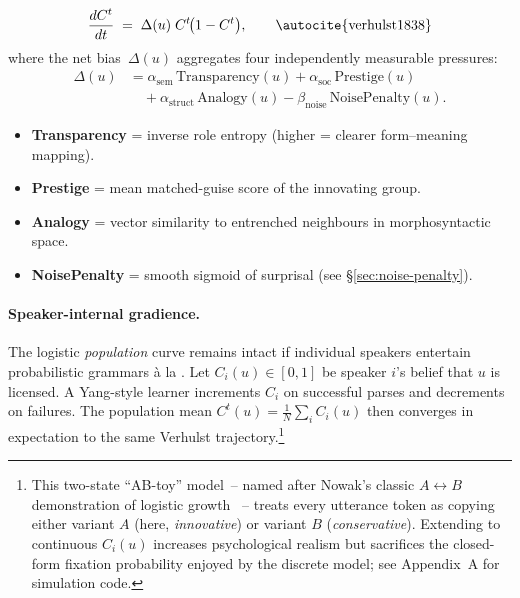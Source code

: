 \documentclass[12pt]{article}
\begin{document}
\begin{equation}
\frac{dC^{t}}{dt} \;=\; \Delta(u)\;C^{t}\!\bigl(1-C^{t}\bigr),
\qquad
\text{\autocite{verhulst1838}}
\end{equation}
where the net bias~$\Delta(u)$ aggregates four independently measurable pressures:
\begin{equation}\label{eq:delta-expanded}
\begin{split}
\Delta(u) &= \alpha_{\mathrm{sem}}\,\text{Transparency}(u) + \alpha_{\mathrm{soc}}\,\text{Prestige}(u) \\
&\quad + \alpha_{\mathrm{struct}}\,\text{Analogy}(u) - \beta_{\mathrm{noise}}\,\text{NoisePenalty}(u).
\end{split}
\end{equation}

\begin{itemize}
  \item \textbf{Transparency} = inverse role entropy (higher = clearer form–meaning mapping).
  \item \textbf{Prestige} = mean matched-guise score of the innovating group.
  \item \textbf{Analogy} = vector similarity to entrenched neighbours in morphosyntactic space.
  \item \textbf{NoisePenalty} = smooth sigmoid of surprisal (see \S\ref{sec:noise-penalty}).
\end{itemize}

\paragraph{Speaker-internal gradience.}
The logistic \emph{population} curve remains intact if individual speakers entertain probabilistic grammars à la \textcite{Yang2000}.  Let $C_i(u)\!\in[0,1]$ be speaker $i$'s belief that $u$ is licensed.  A Yang-style learner increments $C_i$ on successful parses and decrements on failures.  The population mean $C^{t}(u)=\tfrac1N\sum_i C_i(u)$ then converges in expectation to the same Verhulst trajectory.\footnote{This two-state \enquote{AB-toy} model~-- named after Nowak's classic $A{\leftrightarrow}B$ demonstration of logistic growth \citeyearpar{Nowak2001}~-- treats every utterance token as copying either variant $A$ (here, \emph{innovative}) or variant $B$ (\emph{conservative}).  Extending to continuous $C_i(u)$ increases psychological realism but sacrifices the closed-form fixation probability enjoyed by the discrete model; see Appendix~A for simulation code.}
\end{document}
